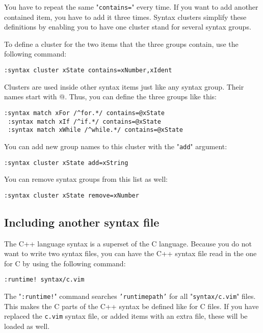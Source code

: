 You have to repeat the same "\texttt{contains=}" every time.
If you want to add another contained item, you have to add it three times.
Syntax clusters simplify these definitions by enabling you to have one cluster stand for several syntax groups.

To define a cluster for the two items that the three groups contain, use the following command:

\begin{Verbatim}[samepage=true]
 :syntax cluster xState contains=xNumber,xIdent
\end{Verbatim}

Clusters are used inside other syntax items just like any syntax group.
Their names start with @.
Thus, you can define the three groups like this:

\begin{Verbatim}[samepage=true]
 :syntax match xFor /^for.*/ contains=@xState
 :syntax match xIf /^if.*/ contains=@xState
 :syntax match xWhile /^while.*/ contains=@xState
\end{Verbatim}

You can add new group names to this cluster with the "\texttt{add}" argument:

\begin{Verbatim}[samepage=true]
 :syntax cluster xState add=xString
\end{Verbatim}

You can remove syntax groups from this list as well:

\begin{Verbatim}[samepage=true]
 :syntax cluster xState remove=xNumber
\end{Verbatim}

\subsection{Including another syntax file}
The C++ language syntax is a superset of the C language.
Because you do not want to write two syntax files, you can have the C++ syntax file read in the one for C by using the following command:

\begin{Verbatim}[samepage=true]
 :runtime! syntax/c.vim
\end{Verbatim}

The "\texttt{:runtime!}" command searches \texttt{'runtimepath'} for all "\texttt{syntax/c.vim}" files.
This makes the C parts of the C++ syntax be defined like for C files.
If you have replaced the \texttt{c.vim} syntax file, or added items with an extra file, these will be loaded as well.

